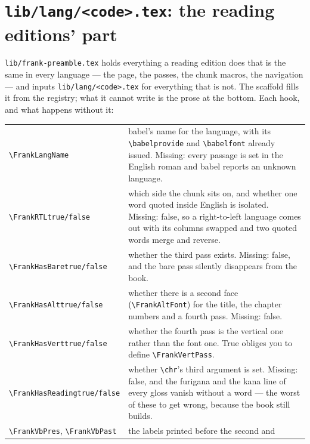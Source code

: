 \documentclass[11pt,oneside]{report}
\newcommand{\file}[1]{\texttt{#1}}
\begin{document}
\section{\file{lib/lang/<code>.tex}: the reading editions' part}

\file{lib/frank-preamble.tex} holds everything a reading edition does that is
the same in every language --- the page, the passes, the chunk macros, the
navigation --- and inputs \file{lib/lang/<code>.tex} for everything that is
not. The scaffold fills it from the registry; what it cannot write is the
prose at the bottom. Each hook, and what happens without it:

\begin{center}
\small
\begin{longtable}{@{}>{\raggedright\arraybackslash}p{}p{}@{}}
\toprule
\texttt{\textbackslash FrankLangName} & babel's name for the language, with its
  \texttt{\textbackslash babelprovide} and \texttt{\textbackslash babelfont}
  already issued. Missing: every passage is set in the English roman and babel
  reports an unknown language. \\
\addlinespace
\texttt{\textbackslash FrankRTLtrue/false} & which side the chunk sits on, and
  whether one word quoted inside English is isolated. Missing: false, so a
  right-to-left language comes out with its columns swapped and two quoted
  words merge and reverse. \\
\addlinespace
\texttt{\textbackslash FrankHasBaretrue/false} & whether the third pass exists.
  Missing: false, and the bare pass silently disappears from the book. \\
\addlinespace
\texttt{\textbackslash FrankHasAlttrue/false} & whether there is a second face
  (\texttt{\textbackslash FrankAltFont}) for the title, the chapter numbers and
  a fourth pass. Missing: false. \\
\addlinespace
\texttt{\textbackslash FrankHasVerttrue/false} & whether the fourth pass is the
  vertical one rather than the font one. True obliges you to define
  \texttt{\textbackslash FrankVertPass}. \\
\addlinespace
\texttt{\textbackslash FrankHasReadingtrue/false} & whether
  \texttt{\textbackslash chr}'s third argument is set. Missing: false, and the
  furigana and the kana line of every gloss vanish without a word --- the
  worst of these to get wrong, because the book still builds. \\
\addlinespace
\texttt{\textbackslash FrankVbPres},
\texttt{\textbackslash FrankVbPast} & the labels printed before the second and

\end{longtable}
\end{center}
\end{document}
